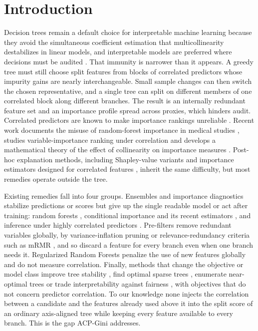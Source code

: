 \documentclass[pdflatex,sn-basic,Numbered]{sn-jnl}
\begin{document}
\maketitle

\section{Introduction}
Decision trees remain a default choice for interpretable machine learning because they avoid the simultaneous coefficient estimation that multicollinearity destabilizes in linear models, and interpretable models are preferred where decisions must be audited \cite{rudin2019stop}. That immunity is narrower than it appears. A greedy tree must still choose split features from blocks of correlated predictors whose impurity gains are nearly interchangeable. Small sample changes can then switch the chosen representative, and a single tree can split on different members of one correlated block along different branches. The result is an internally redundant feature set and an importance profile spread across proxies, which hinders audit. Correlated predictors are known to make importance rankings unreliable \cite{tolosi2011correlated}. Recent work documents the misuse of random-forest importance in medical studies \cite{wallace2023misuse}, studies variable-importance ranking under correlation \cite{liang2024challenges} and develops a mathematical theory of the effect of collinearity on importance measures \cite{bladen2025collinearity}. Post-hoc explanation methods, including Shapley-value variants and importance estimators designed for correlated features \cite{hu2024manifold,frohlich2025decorrelated}, inherit the same difficulty, but most remedies operate outside the tree.

Existing remedies fall into four groups. Ensembles and importance diagnostics stabilize predictions or scores but give up the single readable model or act after training: random forests \cite{breiman2001random}, conditional importance \cite{strobl2008conditional} and its recent estimators \cite{blesch2023conditional,blesch2025conditional}, and inference under highly correlated predictors \cite{zhang2025subspace}. Pre-filters remove redundant variables globally, by variance-inflation pruning \cite{dormann2013collinearity} or relevance-redundancy criteria such as mRMR \cite{peng2005mrmr,kuzudisli2023grouping,naylor2026smrmr}, and so discard a feature for every branch even when one branch needs it. Regularized Random Forests \cite{deng2012rrf} penalize the use of new features globally and do not measure correlation. Finally, methods that change the objective or model class improve tree stability \cite{bertsimas2023stability}, find optimal sparse trees \cite{hu2019optimal,zhang2023osrt,babbar2025split}, enumerate near-optimal trees \cite{arslan2025sorted,hsu2025rashomon} or trade interpretability against fairness \cite{jo2023fair}, with objectives that do not concern predictor correlation. To our knowledge none injects the correlation between a candidate and the features already used above it into the split score of an ordinary axis-aligned tree while keeping every feature available to every branch. This is the gap ACP-Gini addresses.
\end{document}
